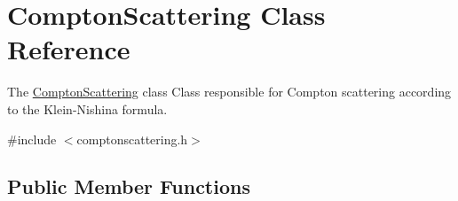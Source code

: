 \hypertarget{classComptonScattering}{}\section{Compton\+Scattering Class Reference}
\label{classComptonScattering}


The \hyperlink{classComptonScattering}{Compton\+Scattering} class Class responsible for Compton scattering according to the Klein-\/\+Nishina formula.  




{\ttfamily \#include $<$comptonscattering.\+h$>$}

\subsection*{Public Member Functions}
